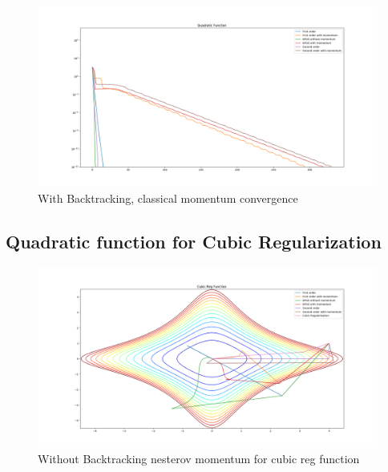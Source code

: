 \documentclass{article}
\begin{document}
\begin{figure}[H]
	\includegraphics[width=\linewidth]{../Images/quadraticmomentumbacktrack1.png}
	\caption{With Backtracking, classical momentum convergence}
	\label{fig:With Backtracking, classical momentum convergence for quadratic function}
\end{figure}

\subsection{Quadratic function for Cubic Regularization}

\begin{figure}[H]
	\includegraphics[width=\linewidth]{../Images/cubicregularizationnesterov.png}
	\caption{Without Backtracking nesterov momentum for cubic reg function}
	\label{fig:Without Backtracking nesterov momentum for cubic reg function}
\end{figure}
\end{document}
